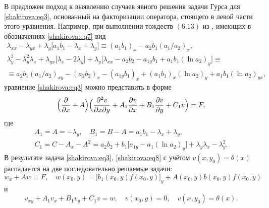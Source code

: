В \cite[c.~136]{shakirova:6-ru}  предложен подход к выявлению случаев явного решения задачи Гурса для \eqref{shakirova:eq3},  основанный на факторизации оператора, стоящего в левой части этого уравнения. 
Например, при выполнении тождеств $(6.13)$ из \cite{shakirova:6-ru}, имеющих в обозначениях \eqref{shakirova:eq7} вид
\begin{gather}
\lambda_{xx}-\lambda_{yx}+\lambda_y \bigl[a_1b_1-\lambda_x+\lambda_y\bigr]\equiv(a_1b_1)_x-a_2b_1\left({a_1}/{a_2}\right)_x,
\\
\label{shakirova:eq9}
\lambda^3_y-\lambda^2_y\lambda_x+\lambda_{yx}\bigl[\lambda_x-2\lambda_y\bigr]+\lambda_y\bigl[\lambda_{xx}-a_2b_2-a_{1y}b_1+a_1b_1(\ln a_2)_y\bigr]\equiv
\\
\equiv a_2b_1\left({a_1}/{a_2}\right)_{xy}-(a_2b_2)_x-(a_{1y}b_1)_x+(a_1b_1)_x(\ln a_2)_y+a_1b_1(\ln a_2)_{yx},
\end{gather}
уравнение \eqref{shakirova:eq3} можно представить в форме
$$
\Bigl(\frac{\partial}{\partial x}+A\Bigr)\Bigl(\frac{\partial^2v}{\partial x\partial y}+A_1\frac{\partial v}{\partial x}+B_1\frac{\partial v}{\partial y}+C_1v\Bigr)=F,
$$
где
\begin{equation}
\label{shakirova:eq10}
\begin{array}{c}
A_1=A=-\lambda_y, \quad B_1=B-A=a_1b_1-\lambda_x+\lambda_y,\\
C_1=C-A_x-A^2=a_2b_2+b_1\bigl[a_{1y}-a_1(\ln a_2)_y\bigr]+\lambda_y\lambda_x-\lambda^2_y.
\end{array}
\end{equation}
В результате задача \eqref{shakirova:eq3}, \eqref{shakirova:eq8} с учётом $v(x, y_0)=\theta(x)$ распадается на две последовательно решаемые задачи:
\begin{equation}
\label{shakirova:eq11}
w_x+Aw=F, \quad w(x_0,y)=\bigl[b_1(x_0, y)f(x_0, y)\bigr]_y+A(x_0, y)b(x_0, y)f(x_0, y)
\end{equation}
и
\begin{equation}
\label{shakirova:eq12}
v_{xy}+A_1v_x+B_1v_y+C_1v=w, \quad v(x_0, y)=0, \quad v(x,y_0)=\theta(x).
\end{equation}

